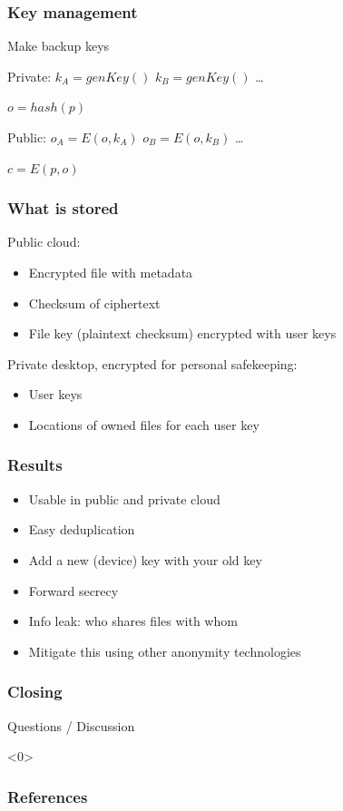 \documentclass{beamer}
\begin{document}

\begin{frame}
    \frametitle{Key management}
    Make backup keys

    Private:
    $k_A = genKey()$
    $k_B = genKey()$
    \dots

    $o = hash(p)$

    Public:
    $o_A = E(o, k_A)$
    $o_B = E(o, k_B)$
    \dots

    $c = E(p,o)$
\end{frame}

\begin{frame}
    \frametitle{What is stored}
    Public cloud:
    \begin{itemize}
    \item Encrypted file with metadata
    \item Checksum of ciphertext
    \item File key (plaintext checksum) encrypted with user keys
    \end{itemize}

    Private desktop, encrypted for personal safekeeping:
    \begin{itemize}
    \item User keys
    \item Locations of owned files for each user key
    \end{itemize}
\end{frame}

\begin{frame}
    \frametitle{Results}
    \begin{itemize}
    \item Usable in public and private cloud
    \item Easy deduplication
    \item Add a new (device) key with your old key
    \item Forward secrecy
    \item Info leak: who shares files with whom
    \item Mitigate this using other anonymity technologies
    \end{itemize}
\end{frame}

\begin{frame}
    \frametitle{Closing}
    Questions / Discussion
\end{frame}

\begin{frame}<0>
    \frametitle{References}
    
    
\end{frame}
\end{document}

